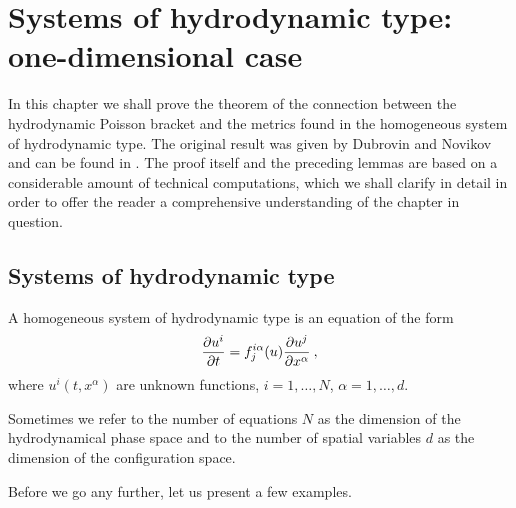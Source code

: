 \chapter{Systems of hydrodynamic type: one-dimensional case}

In this chapter we shall prove the theorem of the connection between the hydrodynamic Poisson bracket and the metrics found in the homogeneous system of hydrodynamic type. The original result was given by Dubrovin and Novikov and can be found in \cite{Dubrovin-Novikov}. The proof itself and the preceding lemmas are based on a considerable amount of technical computations, which we shall clarify in detail in order to offer the reader a comprehensive understanding of the chapter in question.



\section{Systems of hydrodynamic type}

\begin{definition}
    A homogeneous system of hydrodynamic type is an equation of the form
    \begin{align}
        \label{eq:h-system}
        \frac{\partial u^i}{\partial t} = f_j^{i \alpha} (u) \frac{\partial u^j}{\partial x^\alpha} \:,
    \end{align}
    where $u^i(t,x^\alpha)$ are unknown functions, $i = 1, \dots , N$, $\alpha = 1, \dots , d$.
\end{definition}

Sometimes we refer to the number of equations $N$ as the dimension of the hydrodynamical phase space and to the number of spatial variables $d$ as the dimension of the configuration space.

Before we go any further, let us present a few examples.

